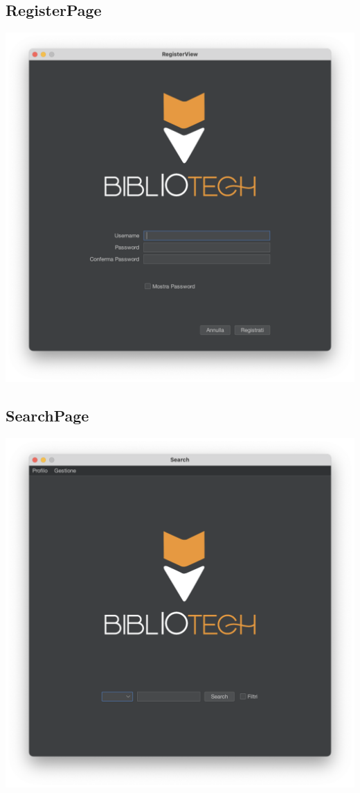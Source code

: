 \subsection{RegisterPage}
\includegraphics[scale=0.25]{Immagini/Schermate/Login_Register/RegisterPage.png}

\subsection{SearchPage}
\includegraphics[scale=0.25]{Immagini/Schermate/Search/SearchPage.png}
